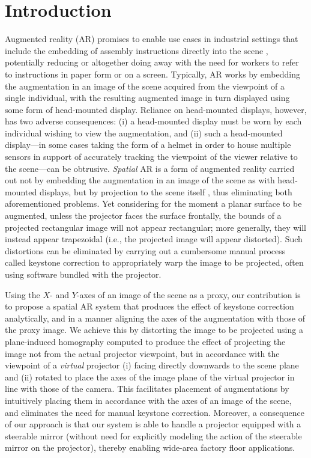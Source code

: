 \documentclass[review]{elsarticle}
\begin{document}
\linenumbers

\section{Introduction}\label{sec:intro}

Augmented reality (AR) \cite{van2010survey,zhou2008trends} promises to enable use cases in industrial settings that include the embedding of assembly instructions directly into the scene \cite{schlund2018moglichkeiten,masood2019augmented,gattullo2019towards}, potentially reducing or altogether doing away with the need for workers to refer to instructions in paper form or on a screen. Typically, AR works by embedding the augmentation in an image of the scene acquired from the viewpoint of a single individual, with the resulting augmented image in turn displayed using some form of head-mounted display. Reliance on head-mounted displays, however, has two adverse consequences: (i) a head-mounted display must be worn by each individual wishing to view the augmentation, and (ii) such a head-mounted display---in some cases taking the form of a helmet in order to house multiple sensors in support of accurately tracking the viewpoint of the viewer relative to the scene---can be obtrusive. \textit{Spatial} AR is a form of augmented reality carried out not by embedding the augmentation in an image of the scene as with head-mounted displays, but by projection to the scene itself \cite{bimber2019spatial}, thus eliminating both aforementioned problems. Yet considering for the moment a planar surface to be augmented, unless the projector faces the surface frontally, the bounds of a projected rectangular image will not appear rectangular; more generally, they will instead appear trapezoidal (i.e., the projected image will appear distorted). Such distortions can be eliminated by carrying out a cumbersome manual process called keystone correction to appropriately warp the image to be projected, often using software bundled with the projector.

Using the $X$- and $Y$-axes of an image of the scene as a proxy, our contribution is to propose a spatial AR system that produces the effect of keystone correction analytically, and in a manner aligning the axes of the augmentation with those of the proxy image. We achieve this by distorting the image to be projected using a plane-induced homography computed to produce the effect of projecting the image not from the actual projector viewpoint, but in accordance with the viewpoint of a \textit{virtual} projector (i) facing directly downwards to the scene plane and (ii) rotated to place the axes of the image plane of the virtual projector in line with those of the camera. This facilitates placement of augmentations by intuitively placing them in accordance with the axes of an image of the scene, and eliminates the need for manual keystone correction. Moreover, a consequence of our approach is that our system is able to handle a projector equipped with a steerable mirror (without need for explicitly modeling the action of the steerable mirror on the projector), thereby enabling wide-area factory floor applications.
\end{document}
